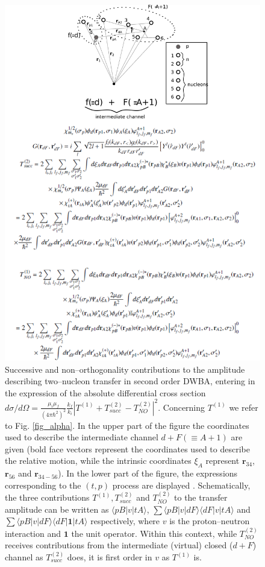 \begin{figure}
\centerline{\includegraphics*[width=\textwidth,angle=0]{nutshell/figs/fig_beta.pdf}}
\caption{Successive and non--orthogonality contributions to the  amplitude describing two--nucleon transfer in second order DWBA, entering in the expression of the absolute differential cross section $d\sigma/d\Omega=\tfrac{\mu_i\mu_f}{(4\pi\hbar^2)^2}\tfrac{k_f}{k_i}\left|T^{(1)}+T_{succ}^{(2)}-T^{(2)}_{NO}\right|^2$. Concerning $T^{(1)}$ we refer to Fig. \ref{fig_alpha}. In the upper part of the figure the coordinates used to describe the intermediate channel $d+F(\equiv A+1)$ are given (bold face vectors represent the coordinates used to describe the relative motion, while the intrinsic coordinates $\xi_A$ represent $\mathbf r_{34}$, $\mathbf r_{56}$ and $\mathbf r_{34-56}$). In the lower part of the figure, the  expressions corresponding to the $(t,p)$ process are displayed \citep{Potel:13b}. Schematically, the three contributions $T^{(1)}, T^{(2)}_{succ}$ and $T^{(2)}_{NO}$ to the transfer amplitude can be written as $\langle pB|v|tA\rangle$, $\sum \langle pB|v|dF\rangle\langle dF|v|tA\rangle$ and $\sum \langle pB|v|dF\rangle\langle dF| \mathbf{1}|tA\rangle$ respectively, where $v$ is the proton--neutron interaction and $\mathbf 1$ the unit operator. Within this context, while $T^{(2)}_{NO}$ receives contributions from the intermediate (virtual) closed ($d+F$) channel as $T^{(2)}_{succ}$ does, it is first order in $v$ as $T^{(1)}$ is.}\label{fig_beta}
\end{figure}
